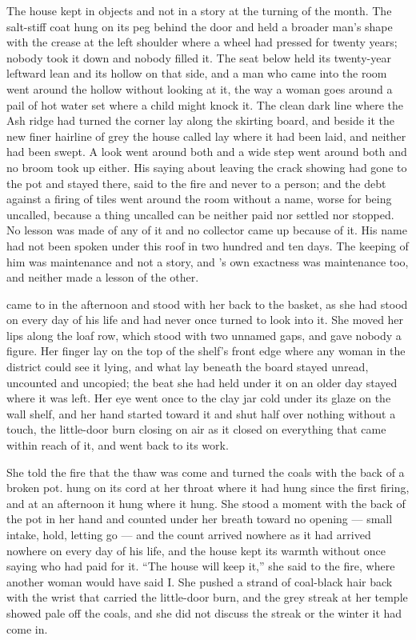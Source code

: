 \scenebreak

The house kept  in objects and not in a story at the turning of the month. The salt-stiff coat hung on its peg behind the door and held a broader man's shape with the crease at the left shoulder where a wheel had pressed for twenty years; nobody took it down and nobody filled it. The seat below held its twenty-year leftward lean and its hollow on that side, and a man who came into the room went around the hollow without looking at it, the way a woman goes around a pail of hot water set where a child might knock it. The clean dark line where the Ash ridge had turned the corner lay along the skirting board, and beside it the new finer hairline of grey the house called  lay where it had been laid, and neither had been swept. A look went around both and a wide step went around both and no broom took up either. His saying about leaving the crack showing had gone to the pot and stayed there, said to the fire and never to a person; and the debt against a firing of tiles went around the room without a name, worse for being uncalled, because a thing uncalled can be neither paid nor settled nor stopped. No lesson was made of any of it and no collector came up  because of it. His name had not been spoken under this roof in two hundred and ten days. The keeping of him was maintenance and not a story, and 's own exactness was maintenance too, and neither made a lesson of the other.

\scenebreak

 came to  in the afternoon and stood with her back to the basket, as she had stood on every day of his life and had never once turned to look into it. She moved her lips along the loaf row, which stood with two unnamed gaps, and gave nobody a figure. Her finger lay on the top of the shelf's front edge where any woman in the district could see it lying, and what lay beneath the board stayed unread, uncounted and uncopied; the beat she had held under it on an older day stayed where it was left. Her eye went once to the clay jar cold under its glaze on the wall shelf, and her hand started toward it and shut half over nothing without a touch, the little-door burn closing on air as it closed on everything that came within reach of it, and went back to its work.

She told the fire that the thaw was come and turned the coals with the back of a broken pot.  hung on its cord at her throat where it had hung since the first firing, and at an afternoon it hung where it hung. She stood a moment with the back of the pot in her hand and counted under her breath toward no opening --- small intake, hold, letting go --- and the count arrived nowhere as it had arrived nowhere on every day of his life, and the house kept its warmth without once saying who had paid for it. “The house will keep it,” she said to the fire, where another woman would have said I. She pushed a strand of coal-black hair back with the wrist that carried the little-door burn, and the grey streak at her temple showed pale off the coals, and she did not discuss the streak or the winter it had come in.

